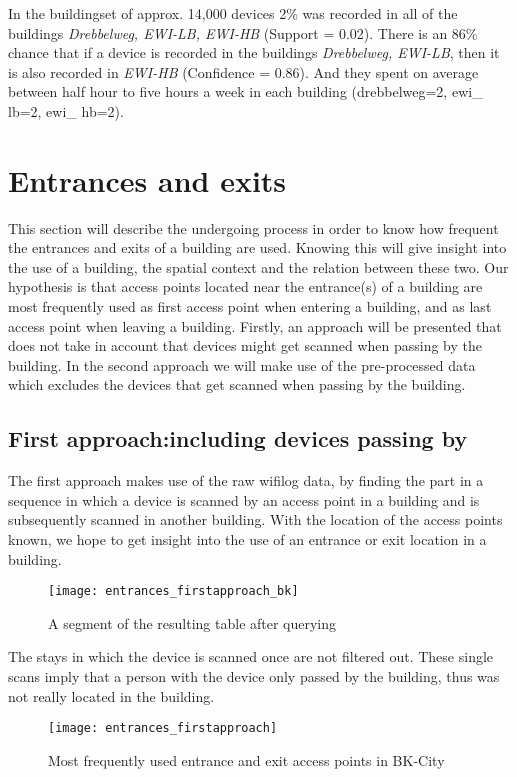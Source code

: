 In the buildingset of approx. 14,000 devices 2\% was recorded in all of the buildings \textit{Drebbelweg, EWI-LB, EWI-HB} (Support = 0.02). There is an 86\% chance that if a device is recorded in the buildings \textit{Drebbelweg, EWI-LB}, then it is also recorded in \textit{EWI-HB} (Confidence = 0.86). And they spent on average between half hour to five hours a week in each building (drebbelweg=2, ewi\_ lb=2, ewi\_ hb=2).

\section{Entrances and exits}\label{entrances and exists}
This section will describe the undergoing process in order to know how frequent the entrances and exits of a building are used. Knowing this will give insight into the use of a building, the spatial context and the relation between these two. Our hypothesis is that access points located near the entrance(s) of a building are most frequently used as first access point when entering a building, and as last access point when leaving a building. Firstly, an approach will be presented that does not take in account that devices might get scanned when passing by the building. In the second approach we will make use of the pre-processed data which excludes the devices that get scanned when passing by the building. 

\subsection{First approach:including devices passing by}
The first approach makes use of the raw wifilog data, by finding the part in a sequence in which a device is scanned by an access point in a building and is subsequently scanned in another building. With the location of the access points known, we hope to get insight into the use of an entrance or exit location in a building. 
\begin{figure}[H]
\centering
\texttt{[image: entrances\_firstapproach\_bk]}
\captionsetup{justification=centering}
\caption{A segment of the resulting table after querying}
\label{figure:Entrance1ApproachTable}
\end{figure}

The stays in which the device is scanned once are not filtered out. These single scans imply that a person with the device only passed by the building, thus was not really located in the building. 

\begin{figure}[H]
\centering
\texttt{[image: entrances\_firstapproach]}
\captionsetup{justification=centering}
\caption{Most frequently used entrance and exit access points in BK-City}
\label{figure:Entrance1Approachfigure}
\end{figure}


